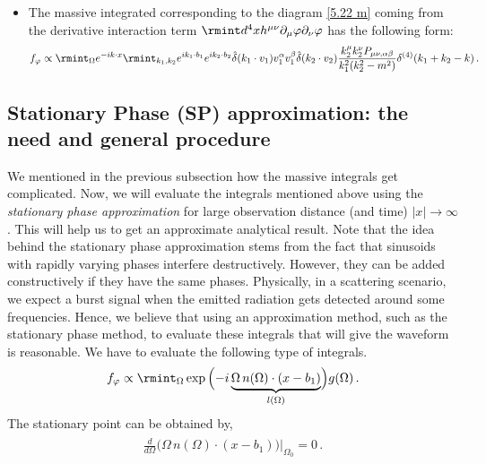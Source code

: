 \begin{itemize}
     \item The massive integrated corresponding to the diagram \eqref{5.22 m} coming from the derivative interaction term $\rmint d^4x h^{\mu\nu}\partial_{\mu}\varphi\partial_\nu \varphi$ has the following form:
    \begin{align}
        \begin{split}
            f_{\varphi}\propto \rmint_{\Omega}e^{-ik\cdot x}\rmint_{k_1,k_2}e^{ik_1\cdot b_1}e^{ik_2\cdot b_2}\hat\delta(k_1\cdot v_1)v_1^{\alpha}v_1^{\beta}\hat\delta(k_2\cdot v_2)\frac{k_2^{\mu}k_2^{\nu}P_{\mu\nu,\alpha\beta}}{k_1^2(k_2^2-m^2)}\delta^{(4)}(k_1+k_2-k) \,.\label{6.10 m}
        \end{split}
    \end{align}
\end{itemize}
{\color{black}
\subsection{Stationary Phase (SP) approximation: the need and general procedure}
We mentioned in the previous subsection how the massive integrals get complicated. Now, we will evaluate the integrals mentioned above using the \textit{stationary phase approximation} for large observation distance (and time) $|x|\rightarrow \infty$. This will help us to get an approximate analytical result. Note that the idea behind the stationary phase approximation stems from the fact that sinusoids with rapidly varying phases interfere destructively. However, they can be added constructively if they have the same phases. Physically, in a scattering scenario, we expect a burst signal when the emitted radiation gets detected around some frequencies. Hence, we believe that using an approximation method, such as the stationary phase method, to evaluate these integrals that will give the waveform is reasonable. 
We have to evaluate the following type of integrals.
\begin{align}
\begin{split}
        f_{\varphi}\propto \rmint_{\Omega}\exp\Big({-i\underbrace{\Omega \,n(\Omega)\cdot (x-b_1)}_{l(\Omega)}}\Big)g(\Omega)\,.\label{6.13 m}
    \end{split}
\end{align}
The stationary point can be obtained by,
\begin{align}
    \begin{split}
        \frac{d}{d\Omega}\Big(\Omega \,n(\Omega)\cdot (x-b_1) \Big)\Big |_{\Omega_0}=0\,.\label{6.14 m}
    \end{split}

\end{align}}
